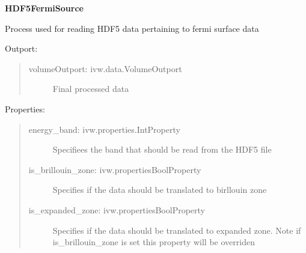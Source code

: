 \documentclass[10pt,oneside,swedish]{article}
\begin{document}
\textbf{HDF5FermiSource}

Process used for reading HDF5 data pertaining to fermi surface data

Outport:

\begin{quote}
\begin{description}
\item[volumeOutport: ivw.data.VolumeOutport]
Final processed data
\end{description}
\end{quote}

Properties:

\begin{quote}
\begin{description}
\item[energy\_band: ivw.properties.IntProperty]
Specifiees the band that should be read from the HDF5 file
\item[is\_brillouin\_zone: ivw.propertiesBoolProperty]
Specifies if the data should be translated to birllouin zone
\item[is\_expanded\_zone: ivw.propertiesBoolProperty]
Specifies if the data should be translated to expanded zone. Note if
is\_brillouin\_zone is set this property will be overriden
\end{description}
\end{quote}
\end{document}
